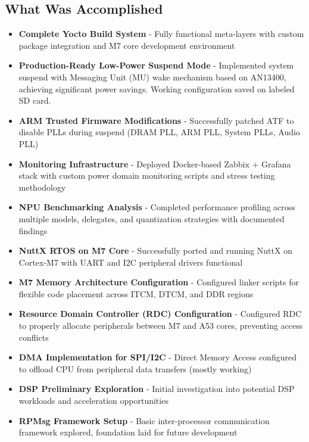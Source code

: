 \documentclass[12pt,a4paper]{report}
\begin{document}
\subsection{What Was Accomplished}
\begin{itemize}
    \item \textbf{Complete Yocto Build System} - Fully functional meta-layers with custom package integration and M7 core development environment
    
    \item \textbf{Production-Ready Low-Power Suspend Mode} - Implemented system suspend with Messaging Unit (MU) wake mechanism based on AN13400, achieving significant power savings. Working configuration saved on labeled SD card.
    
    \item \textbf{ARM Trusted Firmware Modifications} - Successfully patched ATF to disable PLLs during suspend (DRAM PLL, ARM PLL, System PLLs, Audio PLL)
    
    \item \textbf{Monitoring Infrastructure} - Deployed Docker-based Zabbix + Grafana stack with custom power domain monitoring scripts and stress testing methodology
    
    \item \textbf{NPU Benchmarking Analysis} - Completed performance profiling across multiple models, delegates, and quantization strategies with documented findings
    
    \item \textbf{NuttX RTOS on M7 Core} - Successfully ported and running NuttX on Cortex-M7 with UART and I2C peripheral drivers functional
    
    \item \textbf{M7 Memory Architecture Configuration} - Configured linker scripts for flexible code placement across ITCM, DTCM, and DDR regions
    
    \item \textbf{Resource Domain Controller (RDC) Configuration} - Configured RDC to properly allocate peripherals between M7 and A53 cores, preventing access conflicts
    
    \item \textbf{DMA Implementation for SPI/I2C} - Direct Memory Access configured to offload CPU from peripheral data transfers (mostly working)
    
    \item \textbf{DSP Preliminary Exploration} - Initial investigation into potential DSP workloads and acceleration opportunities
    
    \item \textbf{RPMsg Framework Setup} - Basic inter-processor communication framework explored, foundation laid for future development
\end{itemize}
\end{document}
